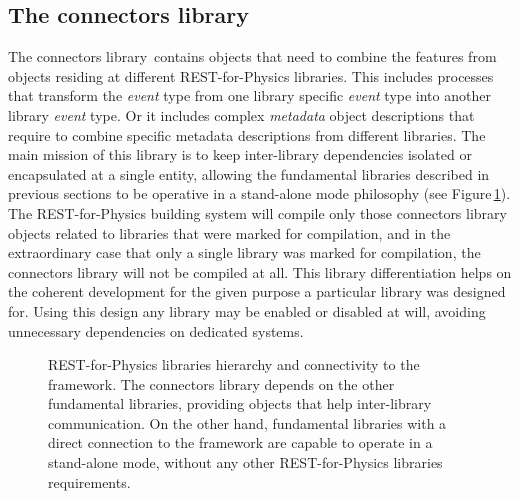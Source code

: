 \subsection{The connectors library}\label{sc:connectorslib}

The connectors library\,\cite{REST_Connectors_Git} contains objects that need to combine the features from objects residing at different REST-for-Physics libraries. This includes processes that transform the \emph{event} type from one library specific \emph{event} type into another library \emph{event} type. Or it includes complex \emph{metadata} object descriptions that require to combine specific metadata descriptions from different libraries. The main mission of this library is to keep inter-library dependencies isolated or encapsulated at a single entity, allowing the fundamental libraries described in previous sections to be operative in a stand-alone mode philosophy (see Figure\,\ref{fig:connectorslib}). The REST-for-Physics building system will compile only those connectors library objects related to libraries that were marked for compilation, and in the extraordinary case that only a single library was marked for compilation, the connectors library will not be compiled at all. This library differentiation helps on the coherent development for the given purpose a particular library was designed for. Using this design any library may be enabled or disabled at will, avoiding unnecessary dependencies on dedicated systems.

\begin{figure}[htb!]
  \centering
	\caption{REST-for-Physics libraries hierarchy and connectivity to the framework. The connectors library depends on the other fundamental libraries, providing objects that help inter-library communication. On the other hand, fundamental libraries with a direct connection to the framework are capable to operate in a stand-alone mode, without any other REST-for-Physics libraries requirements.}\label{fig:connectorslib}
\end{figure}

